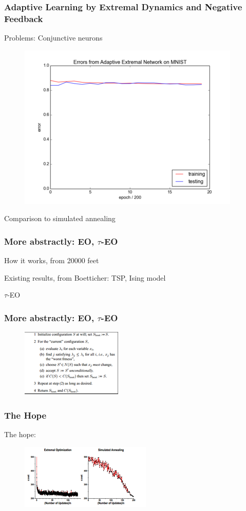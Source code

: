 \documentclass{beamer}
\begin{document}
\begin{frame}
  \frametitle{Adaptive Learning by Extremal Dynamics and Negative Feedback}
  Problems: Conjunctive neurons
  \begin{figure}
    \includegraphics{bak_plot}
  \end{figure}

  Comparison to simulated annealing
\end{frame}

\begin{frame}
  \frametitle{More abstractly: EO, $\tau$-EO}
  How it works, from 20000 feet

  Existing results, from Boetticher: TSP, Ising model

  $\tau$-EO
\end{frame}

\begin{frame}
  \frametitle{More abstractly: EO, $\tau$-EO}
  \begin{figure}
    \includegraphics{eo_alg}
  \end{figure}
\end{frame}

\begin{frame}
  \frametitle{The Hope}
  The hope:
  \begin{figure}
    \includegraphics{boettcher}
  \end{figure}
\end{frame}
\end{document}
